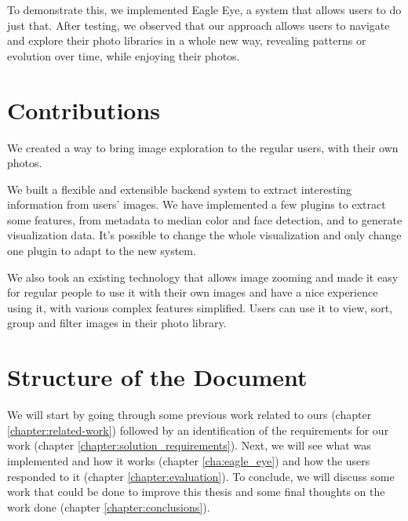 To demonstrate this, we implemented Eagle Eye, a system that allows users to do just that. After testing, we observed that our approach allows users to navigate and explore their photo libraries in a whole new way, revealing patterns or evolution over time, while enjoying their photos.





\section{Contributions} %
\label{sec:contributions}

We created a way to bring image exploration to the regular users, with their own photos.

We built a flexible and extensible backend system to extract interesting information from users' images. We have implemented a few plugins to extract some features, from metadata to median color and face detection, and to generate visualization data. It's possible to change the whole visualization and only change one plugin to adapt to the new system.

We also took an existing technology that allows image zooming and made it easy for regular people to use it with their own images and have a nice experience using it, with various complex features simplified. Users can use it to view, sort, group and filter images in their photo library.



\section{Structure of the Document} %
\label{ssub:structure_of_the_document}

We will start by going through some previous work related to ours (chapter \ref{chapter:related-work}) followed by an identification of the requirements for our work (chapter \ref{chapter:solution_requirements}). Next, we will see what was implemented and how it works (chapter \ref{cha:eagle_eye}) and how the users responded to it (chapter \ref{chapter:evaluation}). To conclude, we will discuss some work that could be done to improve this thesis and some final thoughts on the work done (chapter \ref{chapter:conclusions}).


